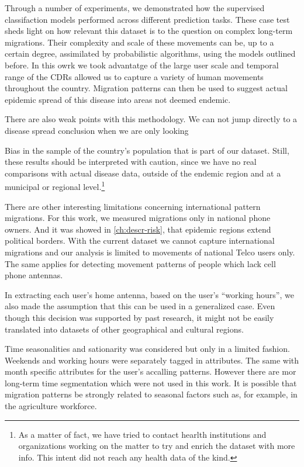 Through a number of experiments, we demonstrated how the supervised classifaction models performed across different prediction tasks.
These case test sheds light on how relevant this dataset is to the question on complex long-term migrations.
Their complexity and scale of these movements can be, up to a certain degree, assimilated by probabilistic algorithms, using the models outlined before.
In this owrk we took advantatge of the large user scale and temporal range of the CDRs allowed us to capture a variety of human movements throughout the country.
Migration patterns can then be used to suggest actual epidemic spread of this disease into areas not deemed endemic.


There are also weak points with this methodology. We can not jump directly to a disease spread conclusion when we are only looking

Bias in the sample of the country's population that is part of our dataset.
Still, these results should be interpreted with caution, since we have no real comparisons with actual disease data, outside of the endemic region and at a municipal or regional level.\footnote{As a matter of fact, we have tried to contact hearlth institutions and organizations working on the matter to try and enrich the dataset with more info. This intent did not reach any health data of the kind.}

There are other interesting limitations concerning international pattern migrations.
For this work, we measured migrations only in national phone owners.
And it was showed in \cref{ch:descr-risk}, that  epidemic regions extend political borders.
With the current dataset we cannot capture international migrations and our analysis is limited to movements of national Telco users only.
The same applies for detecting movement patterns of people which lack cell phone antennas.

In extracting each user's home antenna, based on the user's ``working hours'', we also made the assumption that this can be used in a generalized case.
Even though this decision was supported by past research, it might not be easily translated into datasets of other geographical and cultural regions.

Time seasonalities and sationarity was considered but only in a limited fashion.
Weekends and working hours were separately tagged in attributes.
The same with month specific attributes for the user's accalling patterns.
However there are mor long-term time segmentation which were not used in this work.
It is possible that migration patterns be strongly related to seasonal factors such as, for example, in the agriculture workforce.

